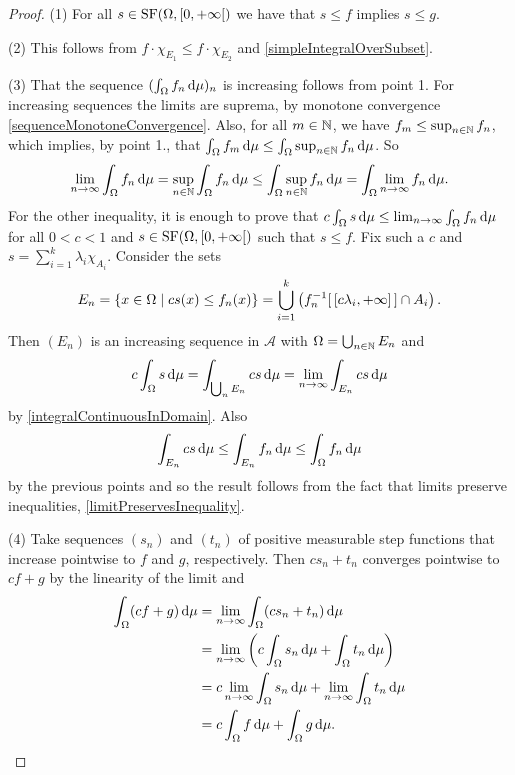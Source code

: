 \begin{proof}
(1) For all $s\in \SF(\Omega, \interval[co]{0,+\infty})$ we have that $s\leq f$ implies $s\leq g$.

(2) This follows from $f\cdot\chi_{E_1}\leq f\cdot\chi_{E_2}$ and \ref{simpleIntegralOverSubset}.

(3) That the sequence $(\int_\Omega f_n\operatorname{d \!}{\mu})_n$ is increasing follows from point 1. For increasing sequences the limits are suprema, by monotone convergence \ref{sequenceMonotoneConvergence}. Also, for all $m\in\mathbb{N}$, we have $f_m\leq\sup_{n\in\mathbb{N}}f_n$, which implies, by point 1., that $\int_\Omega f_m\operatorname{d \!}{\mu}\leq \int_\Omega \sup_{n\in\mathbb{N}}f_n\operatorname{d \!}{\mu}$. So
\[ \lim_{n\to\infty}\int_\Omega f_n\operatorname{d \!}{\mu} = \sup_{n\in\mathbb{N}}\int_\Omega f_n\operatorname{d \!}{\mu} \leq \int_\Omega \sup_{n\in\mathbb{N}}f_n\operatorname{d \!}{\mu} = \int_\Omega \lim_{n\to\infty}f_n\operatorname{d \!}{\mu}. \]
For the other inequality, it is enough to prove that $c\int_\Omega s\operatorname{d \!}{\mu} \leq \lim_{n\to\infty}\int_\Omega f_n\operatorname{d \!}{\mu}$ for all $0<c<1$ and $s\in\operatorname{SF}(\Omega,[0,+\infty[)$ such that $s\leq f$. Fix such a $c$ and $s = \sum_{i=1}^k\lambda_i\chi_{A_i}$. Consider the sets
\[ E_n = \setbuilder{x\in\Omega}{cs(x)\leq f_n(x)} = \bigcup_{i=1}^k \left(f^{-1}_n[\,[c\lambda_i, +\infty]\,]\cap A_i\right). \]
Then $(E_n)$ is an increasing sequence in $\mathcal{A}$ with $\Omega= \bigcup_{n\in\mathbb{N}}E_n$ and
\[ c\int_\Omega s\operatorname{d \!}{\mu} = \int_{\bigcup_n E_n} cs\operatorname{d \!}{\mu} = \lim_{n\to\infty}\int_{E_n} cs\operatorname{d \!}{\mu} \]
by \ref{integralContinuousInDomain}. Also 
\[ \int_{E_n} cs\operatorname{d \!}{\mu} \leq \int_{E_n} f_n\operatorname{d \!}{\mu} \leq \int_{\Omega} f_n\operatorname{d \!}{\mu} \]
by the previous points and so the result follows from the fact that limits preserve inequalities, \ref{limitPreservesInequality}.

(4) Take sequences $(s_n)$ and $(t_n)$ of positive measurable step functions
that increase pointwise to $f$ and $g$, respectively. Then $cs_n+t_n$ converges pointwise to $cf+g$ by the linearity of the limit and
\begin{align*}
\int_\Omega(cf+g)\diff{\mu} &= \lim_{n\to\infty}\int_\Omega(cs_n+t_n)\diff{\mu} \\
&= \lim_{n\to\infty}\left(c\int_\Omega s_n\diff{\mu}+\int_\Omega t_n\diff{\mu}\right) \\
&= c\lim_{n\to\infty}\int_\Omega s_n\diff{\mu}+\lim_{n\to\infty}\int_\Omega t_n\diff{\mu} \\
&= c\int_\Omega f\diff{\mu} + \int_\Omega g\diff{\mu}.
\end{align*}


\end{proof}
